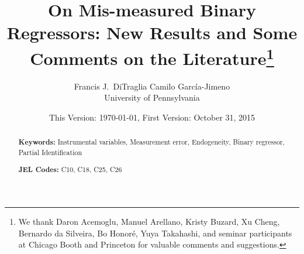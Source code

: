 \documentclass[12pt]{article}
\title{On Mis-measured Binary Regressors: New Results and Some Comments on the Literature\footnote{We thank Daron Acemoglu, Manuel Arellano, Kristy Buzard, Xu Cheng, Bernardo da Silveira, Bo Honor\'{e}, Yuya Takahashi, and seminar participants at Chicago Booth and Princeton for valuable comments and suggestions.}}
\author{Francis J.\ DiTraglia  \hspace{2em} Camilo Garc\'{i}a-Jimeno\\
\normalsize University of Pennsylvania}
\date{\small This Version: \today, First Version: October 31, 2015}
\begin{document}
\maketitle


\begin{abstract}
  \singlespacing
	

  	\bigskip
	\noindent\textbf{Keywords:} Instrumental variables, Measurement error, Endogeneity, Binary regressor, Partial Identification

	\medskip
  \noindent\textbf{JEL Codes:} C10, C18, C25, C26
\end{abstract}

\newpage









\begin{appendices}

\end{appendices}



\end{document}

